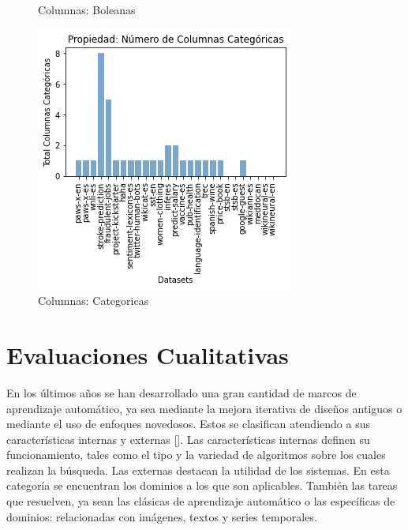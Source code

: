 \begin{figure}
\begin{minipage}[b]{0.31\textwidth}
        \caption{Columnas: Boleanas}
        \label{fig:columns-b}
  \end{minipage}      
\hspace{0.01cm}
    \begin{minipage}[b]{0.31\textwidth}
        \centering
        \includegraphics[width=\textwidth]{Graphics/results/columns_c.png}
          \caption{Columnas: Categoricas}
          \label{fig:columns-c}
        \end{minipage} 
\end{figure}

\section{Evaluaciones Cualitativas}\label{section:qualitative}

En los últimos años se han desarrollado una gran cantidad de marcos de aprendizaje automático, ya sea mediante la mejora iterativa de diseños antiguos o mediante 
el uso de enfoques novedosos. Estos se clasifican atendiendo a sus características internas y externas [\cite{52}]. Las características internas definen su 
funcionamiento, tales como el tipo y la variedad de algoritmos sobre los cuales realizan la búsqueda. Las externas 
destacan la utilidad de los sistemas. En esta categoría se encuentran los dominios a los que son aplicables. También las tareas que resuelven, ya sean las clásicas de 
aprendizaje automático o las específicas de dominios: relacionadas con imágenes, textos y series temporales. 

